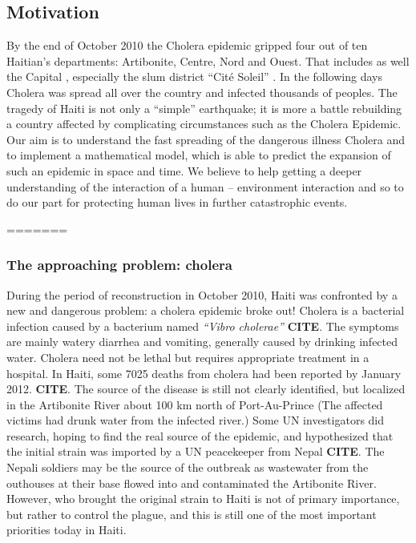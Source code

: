 \documentclass[11pt]{article}
\begin{document}
\subsection{Motivation}
By the end of October 2010 the Cholera epidemic gripped four out of ten Haitian’s departments: Artibonite, Centre, Nord and Ouest. That includes as well the Capital , especially the slum district “Cité Soleil” \cite{web:alj2}. In the following days Cholera was spread all over the country and infected thousands of peoples. The tragedy of Haiti is not only a “simple” earthquake; it is more a battle rebuilding a country affected by complicating circumstances such as the Cholera Epidemic. 
\newline
Our aim is to understand the fast spreading of the dangerous illness Cholera and to implement a mathematical model, which is able to predict the expansion of such an epidemic in space and time. We believe to help getting a deeper understanding of the interaction of a human – environment interaction and so to do our part for protecting human lives in further catastrophic events.

=======
\subsubsection*{The approaching problem: cholera}
During the period of reconstruction in October 2010, Haiti was confronted by a new and dangerous problem: a cholera epidemic broke out! Cholera is a bacterial infection caused by a bacterium named \textit{“Vibro cholerae”} \textbf{CITE}. The symptoms are mainly watery diarrhea and vomiting, generally caused by drinking infected water. Cholera need not be lethal but requires appropriate treatment in a hospital. In Haiti, some 7025 deaths from cholera had been reported by January 2012. \textbf{CITE}.
The source of the disease is still not clearly identified, but localized in the Artibonite River about 100 km north of Port-Au-Prince (The affected victims had drunk water from the infected river.) Some UN investigators did research, hoping to find the real source of the epidemic, and hypothesized that the initial strain was imported by a UN peacekeeper from Nepal \textbf{CITE}. The Nepali soldiers may be the source of the outbreak as wastewater from the outhouses at their base flowed into and contaminated the Artibonite River. However, who brought the original strain to Haiti is not of primary importance, but rather to control the plague, and this is still one of the most important priorities today in Haiti.
\end{document}
